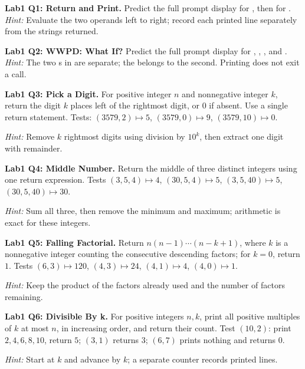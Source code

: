 \begin{prob}
\textbf{Lab1 Q1: Return and Print.} Predict the full prompt display for , then for .
\emph{Hint:} Evaluate the two operands left to right; record each printed line separately from the strings returned.
\end{prob}
\begin{prob}
\textbf{Lab1 Q2: WWPD: What If?} Predict the full prompt display for , , , and .
\emph{Hint:} The two s in  are separate; the  belongs to the second. Printing does not exit a call.
\end{prob}
\begin{prob}
\textbf{Lab1 Q3: Pick a Digit.} For positive integer $ n $ and nonnegative integer $ k $, return the digit $ k $ places left of the rightmost digit, or $0$ if absent. Use a single return statement. Tests: $(3579,2)\mapsto5$, $(3579,0)\mapsto9$, $(3579,10)\mapsto0$.\par
\emph{Hint:} Remove $ k $ rightmost digits using division by $10^k $, then extract one digit with remainder.
\end{prob}
\begin{prob}
\textbf{Lab1 Q4: Middle Number.} Return the middle of three distinct integers using one return expression. Tests $(3,5,4)\mapsto4$, $(30,5,4)\mapsto5$, $(3,5,40)\mapsto5$, $(30,5,40)\mapsto30$.\par
\emph{Hint:} Sum all three, then remove the minimum and maximum; arithmetic is exact for these integers.
\end{prob}
\begin{prob}
\textbf{Lab1 Q5: Falling Factorial.} Return $ n(n-1)\cdots(n-k+1)$, where $ k $ is a nonnegative integer counting the consecutive descending factors; for $ k=0$, return $1$. Tests $(6,3)\mapsto120$, $(4,3)\mapsto24$, $(4,1)\mapsto4$, $(4,0)\mapsto1$.\par
\emph{Hint:} Keep the product of the factors already used and the number of factors remaining.
\end{prob}
\begin{prob}
\textbf{Lab1 Q6: Divisible By k.} For positive integers $ n,k $, print all positive multiples of $ k $ at most $ n $, in increasing order, and return their count. Test $(10,2)$: print $2,4,6,8,10$, return $5$; $(3,1)$ returns $3$; $(6,7)$ prints nothing and returns $0$.\par
\emph{Hint:} Start at $ k $ and advance by $ k $; a separate counter records printed lines.
\end{prob}
